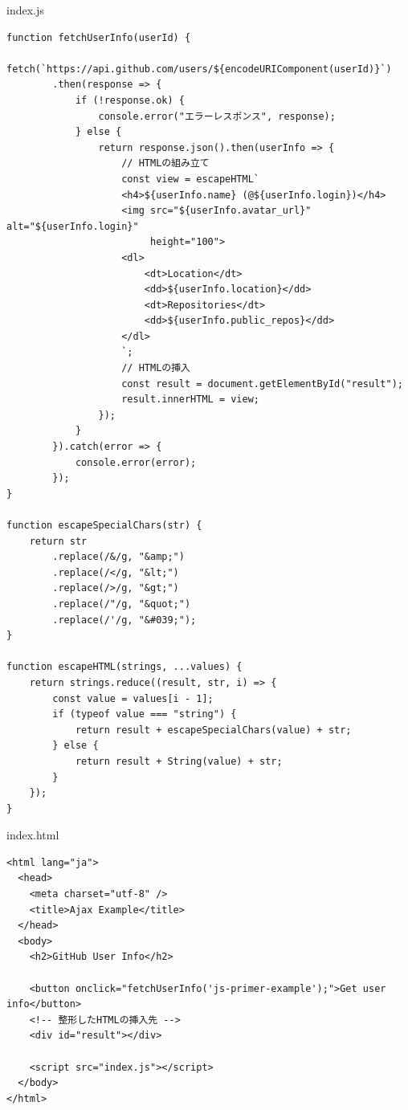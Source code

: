 \begin{listtitle}
index.js
\end{listtitle}
\begin{lstlisting}
function fetchUserInfo(userId) {
    fetch(`https://api.github.com/users/${encodeURIComponent(userId)}`)
        .then(response => {
            if (!response.ok) {
                console.error("エラーレスポンス", response);
            } else {
                return response.json().then(userInfo => {
                    // HTMLの組み立て
                    const view = escapeHTML`
                    <h4>${userInfo.name} (@${userInfo.login})</h4>
                    <img src="${userInfo.avatar_url}" alt="${userInfo.login}" 
                         height="100">
                    <dl>
                        <dt>Location</dt>
                        <dd>${userInfo.location}</dd>
                        <dt>Repositories</dt>
                        <dd>${userInfo.public_repos}</dd>
                    </dl>
                    `;
                    // HTMLの挿入
                    const result = document.getElementById("result");
                    result.innerHTML = view;
                });
            }
        }).catch(error => {
            console.error(error);
        });
}

function escapeSpecialChars(str) {
    return str
        .replace(/&/g, "&amp;")
        .replace(/</g, "&lt;")
        .replace(/>/g, "&gt;")
        .replace(/"/g, "&quot;")
        .replace(/'/g, "&#039;");
}

function escapeHTML(strings, ...values) {
    return strings.reduce((result, str, i) => {
        const value = values[i - 1];
        if (typeof value === "string") {
            return result + escapeSpecialChars(value) + str;
        } else {
            return result + String(value) + str;
        }
    });
}
\end{lstlisting}
\listend

\begin{listtitle}
index.html
\end{listtitle}
\begin{lstlisting}
<html lang="ja">
  <head>
    <meta charset="utf-8" />
    <title>Ajax Example</title>
  </head>
  <body>
    <h2>GitHub User Info</h2>

    <button onclick="fetchUserInfo('js-primer-example');">Get user info</button>
    <!-- 整形したHTMLの挿入先 -->
    <div id="result"></div>

    <script src="index.js"></script>
  </body>
</html>
\end{lstlisting}
\listend


